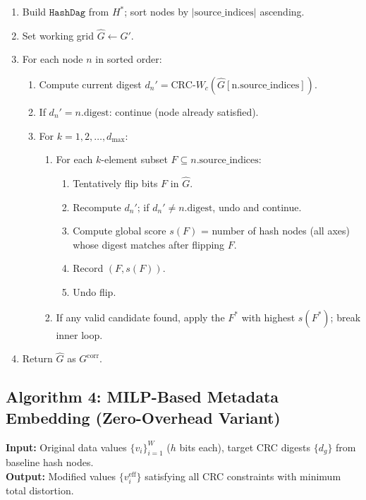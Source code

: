 \begin{enumerate}
    \item Build $\texttt{HashDag}$ from $H^*$; sort nodes by $|\text{source\_indices}|$ ascending.
    \item Set working grid $\hat{G} \gets G'$.
    \item For each node $n$ in sorted order:
    \begin{enumerate}
        \item Compute current digest $d_n' = \text{CRC-}W_c(\hat{G}[\text{n.source\_indices}])$.
        \item If $d_n' = n.\text{digest}$: continue (node already satisfied).
        \item For $k = 1, 2, \ldots, d_{\max}$:
        \begin{enumerate}
            \item For each $k$-element subset $F \subseteq n.\text{source\_indices}$:
            \begin{enumerate}
                \item Tentatively flip bits $F$ in $\hat{G}$.
                \item Recompute $d_n'$; if $d_n' \neq n.\text{digest}$, undo and continue.
                \item Compute global score $s(F)$ = number of hash nodes (all axes) whose digest matches after flipping $F$.
                \item Record $(F, s(F))$.
                \item Undo flip.
            \end{enumerate}
            \item If any valid candidate found, apply the $F^*$ with highest $s(F^*)$; break inner loop.
        \end{enumerate}
    \end{enumerate}
    \item Return $\hat{G}$ as $G^{\text{corr}}$.
\end{enumerate}

\bigskip

\subsection*{Algorithm 4: MILP-Based Metadata Embedding (Zero-Overhead Variant)}

\noindent\textbf{Input:} Original data values $\{v_i\}_{i=1}^{W}$ ($h$ bits each), target CRC digests $\{d_g\}$ from baseline hash nodes.\\
\textbf{Output:} Modified values $\{v_i^{\text{eff}}\}$ satisfying all CRC constraints with minimum total distortion.

